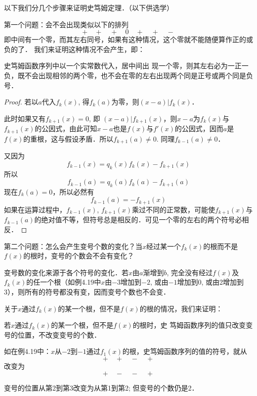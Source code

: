 以下我们分几个步骤来证明史笃姆定理．（以下供选学）

第一个问题：会不会出现类似以下的排列
\[+\quad +\quad +\quad 0\quad +\quad +\quad -\]
即中间有一个零，而其左右同号，如果有这种情况，这个零就不能随便算作正的或负的了．
我们来证明这种情况不会产生，即：
\begin{blk}{}
   史笃姆函数序列中以一个实常数代入，居中间出
现一个零，则其左右必为一正一负，既不会出现相邻的两个零，也不会在零的左右出现两个同是正号或两个同是负号． 
\end{blk}


\begin{proof}
若以$a$代入$f_k(x)$, 得$f_k(a)$为零，则$(x-a) |f_k (x)$．

此时如果又有$f_{k+1}(x)=0$, 即 $(x-a) |f_{k+1} (x)$，则$x-a$为$f_k(x)$与$f_{k+1}(x)$的公因式，由此可知$x-a$也是$f(x)$与$f'(x)$的公因式，因而$a$是$f(x)$的重根，这与假设矛盾．所以$f_{k+1}(a)\ne 0$. 同理$f_{k-1}(a)\ne 0$．

又因为$$f_{k-1}(x)=q_k(x)f_k(x)-f_{k+1}(x)$$所以$$f_{k-1}(a)=q_k(a)f_k(a)-f_{k+1}(a)$$
现在$f_k(a)=0$，所以必然有$$f_{k-1}(a)=-f_{k+1}(x)$$
如果在运算过程中，$f_{k-1}(x)$, $f_{k+1}(x)$乘过不同的正常数，可能使$f_{k+1}(x)$与$f_{k-1}(a)$的绝对值不等，但符号总是相反的．可见一个零的左右的两个符号必相反．
\end{proof}

第二个问题：怎么会产生变号个数的变化？当$x$经过某一个$f_k(x)$的根而不是$f(x)$的根时，变号的个数会不会有变化？

变号数的变化来源于各个符号的变化．若$x$由$a$渐增到$b$, 完全没有经过$f(x)$及$f_k(x)$的任一个根（如例4.19中$x$由$-3$增加到$-2$, 或由$-1$增加到0, 或由2增加到3），则所有的符号都没有变，因而变号个数也不会变．

关于$x$通过$f_k(x)$的某一个根，但不是$f(x)$的根的情况，我们来证明：
\begin{blk}{}
    若$x$通过$f_k(x)$的某一个根，但不是$f(x)$的根时，史
笃姆函数序列的值只改变变号的位置，不改变变号的个数．
\end{blk}

如在例4.19中：$x$从$-2$到$-1$通过$f_1(x)$的根，史笃姆函数序列的值的符号，就从
\[+\quad +\quad -\quad +\]
改变为
\[+\quad -\quad -\quad +\]

变号的位置从第2到第3改变为从第1到第2; 但变号的个数仍是2．

